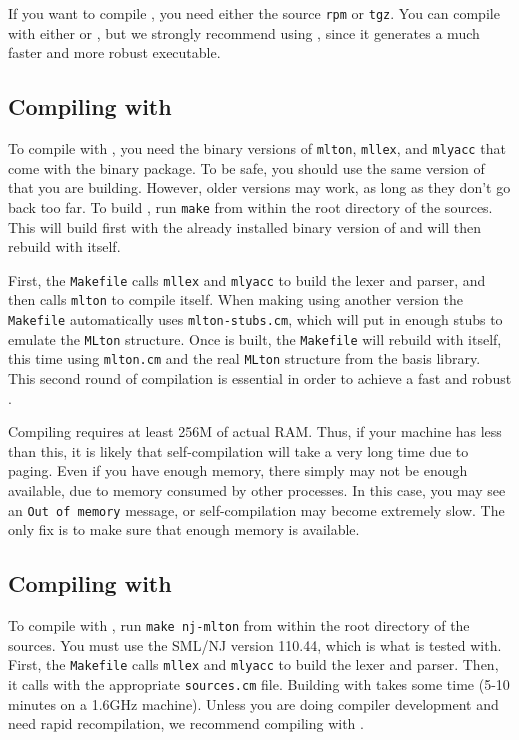 %
If you want to compile {\mlton}, you need either the source {\tt rpm}
or {\tt tgz}.  You can compile with either {\mlton} or {\smlnj}, but
we strongly recommend using {\mlton}, since it generates a much faster
and more robust executable.  
%
\subsection{Compiling with {\mlton}}

To compile with {\mlton}, you need the binary versions of {\tt mlton},
{\tt mllex}, and {\tt mlyacc} that come with the {\mlton} binary
package.  To be safe, you should use the same version of {\mlton} that
you are building.  However, older versions may work, as long as they
don't go back too far.  To build {\mlton}, run {\tt make} from within
the root directory of the sources.  This will build {\mlton} first
with the already installed binary version of {\mlton} and will then
rebuild {\mlton} with itself.

First, the {\tt Makefile} calls {\tt mllex} and {\tt mlyacc} to build
the lexer and parser, and then calls {\tt mlton} to compile itself.
When making {\mlton} using another version the {\tt Makefile}
automatically uses {\tt mlton-stubs.cm}, which will put in enough
stubs to emulate the {\tt MLton} structure.  Once {\mlton} is built,
the {\tt Makefile} will rebuild {\mlton} with itself, this time using
{\tt mlton.cm} and the real {\tt MLton} structure from the basis
library.  This second round of compilation is essential in order to
achieve a fast and robust {\mlton}.

Compiling {\mlton} requires at least 256M of actual RAM.  Thus, if
your machine has less than this, it is likely that self-compilation
will take a very long time due to paging.  Even if you have enough
memory, there simply may not be enough available, due to memory
consumed by other processes.  In this case, you may see an {\tt Out of
memory} message, or self-compilation may become extremely slow.  The
only fix is to make sure that enough memory is available.
%
\subsection{Compiling with {\smlnj}}

To compile with {\smlnj}, run {\tt make nj-mlton} from within the root
directory of the sources.  You must use the SML/NJ version 110.44,
which is what {\mlton} is tested with.  First, the {\tt Makefile}
calls {\tt mllex} and {\tt mlyacc} to build the lexer and parser.
Then, it calls {\smlnj} with the appropriate {\tt sources.cm} file.
Building with {\smlnj} takes some time (5-10 minutes on a 1.6GHz
machine).  Unless you are doing compiler development and need rapid
recompilation, we recommend compiling with {\mlton}.
